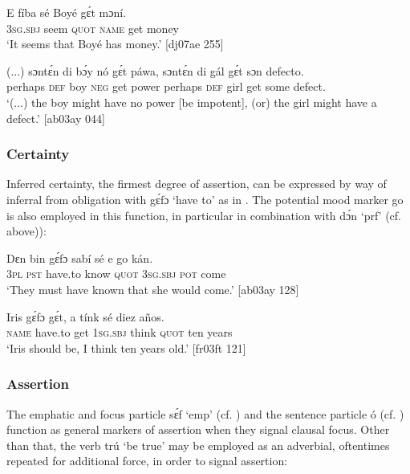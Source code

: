 \ea%
    \label{ex:key:451}
    \gll E    fíba    sé    Boyé  gɛ́t  mɔní. \\
\textsc{3sg.sbj}  seem  \textsc{quot}    \textsc{name}  get  money\\

\glt ‘It seems that Boyé has money.’ [dj07ae 255]
\z


\ea%
    \label{ex:key:452}
    \gll (...)  sɔntɛ́n  di  bɔ́y  nó  gɛ́t  páwa,  sɔntɛ́n  di  gál
gɛ́t  sɔn    defecto.\\
{} perhaps  \textsc{def}  boy  \textsc{neg}  get  power  perhaps  \textsc{def}  girl
get  some  defect.\\

\glt ‘(...) the boy might have no power [be impotent], (or) the girl 
 might have a defect.’ [ab03ay 044]
\z

\subsubsection{Certainty}\label{sec:6.7.4.3}

Inferred certainty, the firmest degree of assertion, can be expressed by way of inferral from obligation with gɛ́fɔ ‘have to’ as in . The potential mood{\fff} marker go is also employed in this function, in particular in combination with dɔ́n ‘prf’ (cf.  above)):{\fff}


\ea%
    \label{ex:key:453}
    \gll Dɛn    bin  gɛ́fɔ    sabí    sé    e    go  kán.\\
\textsc{3pl}    \textsc{pst}  have.to  know  \textsc{quot}    \textsc{3sg.sbj}  \textsc{pot}  come\\

\glt ‘They must have known that she would come.’ [ab03ay 128]
\z


\ea%
    \label{ex:key:454}
    \gll Iris    gɛ́fɔ    gɛ́t,  a    tínk    sé    diez  años.\\
\textsc{name}  have.to  get  \textsc{1sg.sbj}  think  \textsc{quot}    ten  years\\

\glt ‘Iris should be, I think ten years old.’ [fr03ft 121]
\z

\subsubsection{Assertion}\label{sec:6.7.4.4}

The emphatic and focus particle sɛ́f ‘emp’ (cf. ) and the sentence particle{\fff} ó (cf. ) function as general markers of assertion when they signal clausal focus. Other than that, the verb trú ‘be true’ may be employed as an adverbial, oftentimes repeated for additional force, in order to signal assertion:


